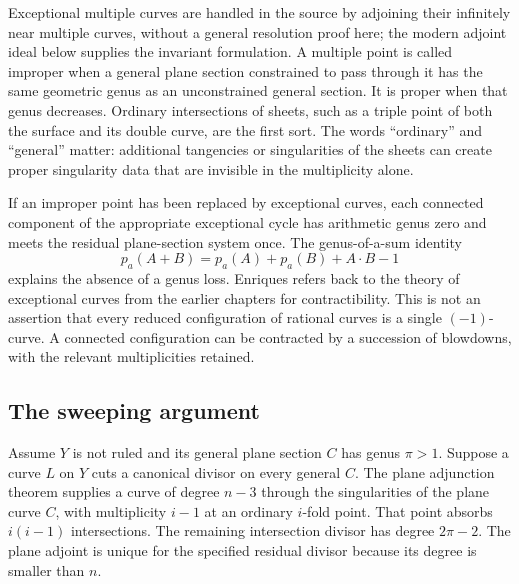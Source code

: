 Exceptional multiple curves are handled in the source by adjoining their infinitely near multiple curves, without a general resolution proof here; the modern adjoint ideal below supplies the invariant formulation. A multiple point is called improper when a general plane section constrained to pass through it has the same geometric genus as an unconstrained general section. It is proper when that genus decreases. Ordinary intersections of sheets, such as a triple point of both the surface and its double curve, are the first sort. The words ``ordinary'' and ``general'' matter: additional tangencies or singularities of the sheets can create proper singularity data that are invisible in the multiplicity alone.

If an improper point has been replaced by exceptional curves, each connected component of the appropriate exceptional cycle has arithmetic genus zero and meets the residual plane-section system once. The genus-of-a-sum identity \[
p_a(A+B)=p_a(A)+p_a(B)+A\cdot B-1
\] explains the absence of a genus loss. Enriques refers back to the theory of exceptional curves from the earlier chapters for contractibility. This is not an assertion that every reduced configuration of rational curves is a single \((-1)\)-curve. A connected configuration can be contracted by a succession of blowdowns, with the relevant multiplicities retained.

\subsection{The sweeping argument}

Assume \(Y\) is not ruled and its general plane section \(C\) has genus \(\pi>1\). Suppose a curve \(L\) on \(Y\) cuts a canonical divisor on every general \(C\). The plane adjunction theorem supplies a curve of degree \(n-3\) through the singularities of the plane curve \(C\), with multiplicity \(i-1\) at an ordinary \(i\)-fold point. That point absorbs \(i(i-1)\) intersections. The remaining intersection divisor has degree \(2\pi-2\). The plane adjoint is unique for the specified residual divisor because its degree is smaller than \(n\).

